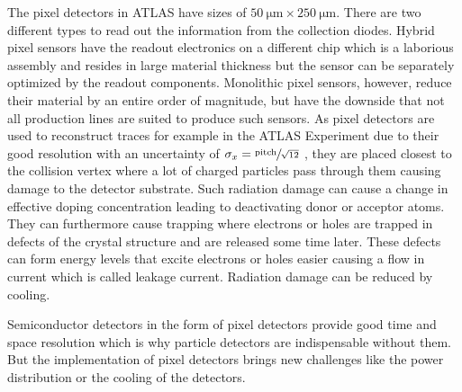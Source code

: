 The pixel detectors in ATLAS have sizes of $\SI{50}{\micro\meter}\times\SI{250}{\micro\meter}$.
There are two different types to read out the information from the collection diodes.
Hybrid pixel sensors have the readout electronics on a different chip which is a laborious assembly and resides in large material thickness but the sensor can be separately optimized by the readout components.
Monolithic pixel sensors, however, reduce their material by an entire order of magnitude, but have the downside that not all production lines are suited to produce such sensors.
As pixel detectors are used to reconstruct traces for example in the ATLAS Experiment due to their good resolution with an uncertainty of $\sigma_x=\sfrac{\text{pitch}}{\sqrt{12}}$ \cite{Tom}, they are placed closest to the collision vertex where a lot of charged particles pass through them causing damage to the detector substrate.
Such radiation damage can cause a change in effective doping concentration leading to deactivating donor or acceptor atoms.
They can furthermore cause trapping where electrons or holes are trapped in defects of the crystal structure and are released some time later.
These defects can form energy levels that excite electrons or holes easier causing a flow in current which is called leakage current.
Radiation damage can be reduced by cooling.

Semiconductor detectors in the form of pixel detectors provide good time and space resolution which is why particle detectors are indispensable without them.
But the implementation of pixel detectors brings new challenges like the power distribution or the cooling of the detectors.

